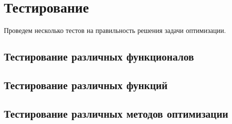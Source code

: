 \chapter{Тестирование}

Проведем несколько тестов на правильность решения задачи оптимизации.

\section{Тестирование различных функционалов}

\section{Тестирование различных функций}

\section{Тестирование различных методов оптимизации}